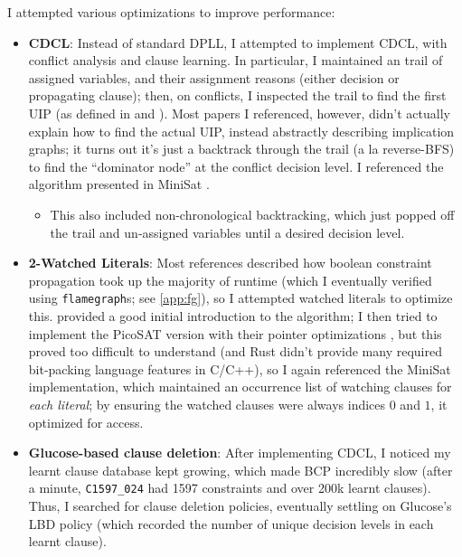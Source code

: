 \documentclass[11pt]{article}
\begin{document}
I attempted various optimizations to improve performance:
\begin{itemize}
    \item \textbf{CDCL}: Instead of standard DPLL, I attempted to implement CDCL, with conflict
        analysis and clause learning. In particular, I maintained an trail of assigned variables,
        and their assignment reasons (either decision or propagating clause); then, on conflicts, I
        inspected the trail to find the first UIP (as defined in \cite{iccad} and
        \cite{GaneshVardi}). Most papers I referenced, however, didn't actually explain how to find
        the actual UIP, instead abstractly describing implication graphs; it turns out it's just a
        backtrack through the trail (a la reverse-BFS) to find the ``dominator node'' at the
        conflict decision level. I referenced the algorithm presented in MiniSat \cite{Een}.
        \begin{itemize}
            \item This also included non-chronological backtracking, which just popped off the trail
                and un-assigned variables until a desired decision level.
        \end{itemize}
    \item \textbf{2-Watched Literals}: Most references described how boolean constraint propagation
        took up the majority of runtime (which I eventually verified using \texttt{flamegraph}s; see
        \ref{app:fg}), so I attempted watched literals to optimize this. \cite{GaneshVardi} provided
        a good initial introduction to the algorithm; I then tried to implement the PicoSAT
        version with their pointer optimizations \cite{Biere}, but this proved too difficult to
        understand (and Rust didn't provide many required bit-packing language features in C/C++),
        so I again referenced the MiniSat\cite{Een} implementation, which maintained an occurrence
        list of watching clauses for \textit{each literal}; by ensuring the watched clauses were
        always indices $0$ and $1$, it optimized for access.
    \item \textbf{Glucose-based clause deletion}: After implementing CDCL, I noticed my learnt
        clause database kept growing, which made BCP incredibly slow (after a minute,
        \texttt{C1597\_024} had 1597 constraints and over 200k learnt clauses). Thus, I searched for
        clause deletion policies, eventually settling on Glucose's \cite{Glucose} LBD policy (which
        recorded the number of unique decision levels in each learnt clause).

\end{itemize}
\end{document}

